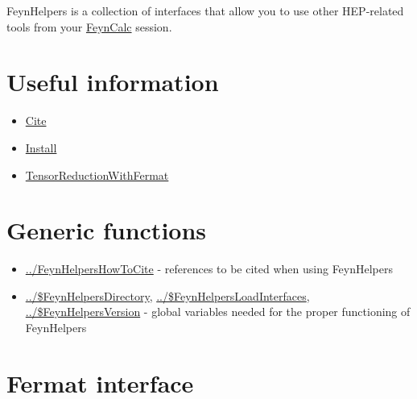\documentclass[../FeynHelpersManual.tex]{subfiles}
\begin{document}
FeynHelpers is a collection of interfaces that allow you to use other
HEP-related tools from your \href{https://feyncalc.github.io}{FeynCalc}
session.

\hypertarget{useful information}{
\section{Useful information}\label{useful information}}

\begin{itemize}
\tightlist
\item
  \hyperlink{cite}{Cite}
\item
  \hyperlink{install}{Install}
\item
  \hyperlink{tensorreductionwithfermat}{TensorReductionWithFermat}
\end{itemize}

\hypertarget{generic functions}{
\section{Generic functions}\label{generic functions}}

\begin{itemize}
\tightlist
\item
  \hyperlink{../feynhelpershowtocite}{../FeynHelpersHowToCite} -
  references to be cited when using FeynHelpers
\item
  \hyperlink{../dollarfeynhelpersdirectory}{../\$FeynHelpersDirectory},
  \hyperlink{../dollarfeynhelpersloadinterfaces}{../\$FeynHelpersLoadInterfaces},
  \hyperlink{../dollarfeynhelpersversion}{../\$FeynHelpersVersion} -
  global variables needed for the proper functioning of FeynHelpers
\end{itemize}

\hypertarget{fermat interface}{
\section{Fermat interface}\label{fermat interface}}
\end{document}
